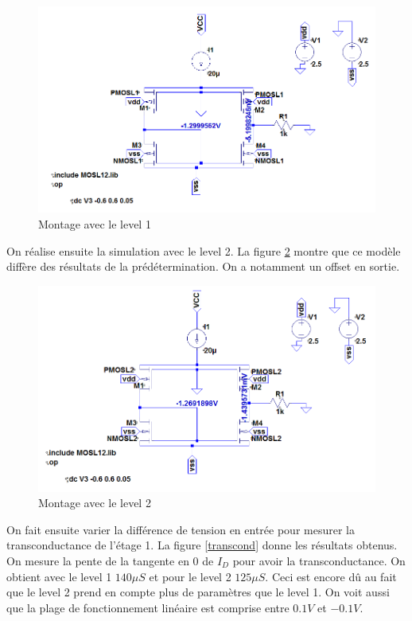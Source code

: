 \documentclass[french]{article}
\begin{document}
\begin{figure}[h!]
\includegraphics[width=\textwidth]{images/21Level1.PNG}
\caption{Montage avec le level 1}
\label{level1}
\end{figure}

On réalise ensuite la simulation avec le level 2. La figure \ref{level2} montre que ce modèle diffère des résultats de la prédétermination. On a notamment un offset en sortie.
\begin{figure}[h!]
\includegraphics[width=\textwidth]{images/21Level2.PNG}
\caption{Montage avec le level 2}
\label{level2}
\end{figure}

On fait ensuite varier la différence de tension en entrée pour mesurer la transconductance de l'étage 1. La figure \ref{transcond} donne les résultats obtenus. On mesure la pente de la tangente en 0 de $I_D$ pour avoir la transconductance. On obtient avec le level 1 $140 \mu S$ et pour le level 2 $125 \mu S$. Ceci est encore dû au fait que le level 2 prend en compte plus de paramètres que le level 1. On voit aussi que la plage de fonctionnement linéaire est comprise entre $0.1V$ et $-0.1V$.
\end{document}

